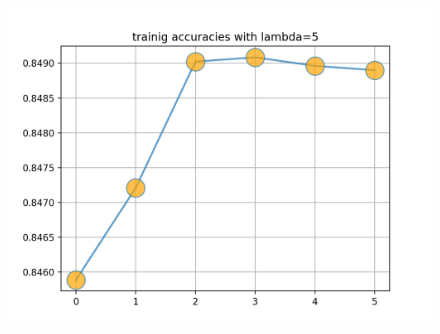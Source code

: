 \documentclass[12pt]{article}
\begin{document}
\begin{figure}[ht]
\includegraphics[scale=0.47]{t5.png}
\end{figure}
\end{document}
